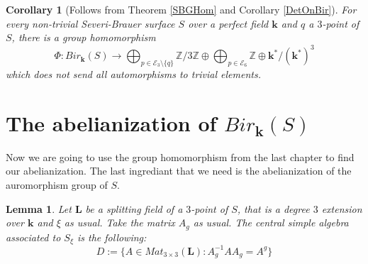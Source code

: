 \documentclass[12pt, oneside, reqno]{amsart}
\newtheorem{lemma}[theorem]{Lemma}
\newtheorem{corollary}[theorem]{Corollary}
\begin{document}
\begin{corollary}[Follows from Theorem \ref{SBGHom} and Corollary \ref{DetOnBir}] \label{AbMap}
    For every non-trivial Severi-Brauer surface $S$ over a perfect field $\textbf{k}$ and $q$ a $3$-point of $S$, there is a group homomorphism \[\Phi:Bir_{\textbf{k}}(S) \rightarrow \bigoplus_{p \in \mathcal{E}_3 \setminus \{ q \}} \mathbb{Z}/3\mathbb{Z} \oplus \bigoplus_{p \in \mathcal{E}_6} \mathbb{Z} \oplus \textbf{k}^* / (\textbf{k}^*)^3\] which does not send all automorphisms to trivial elements.
\end{corollary}

\section{The abelianization of $Bir_{\textbf{k}}(S)$}
\noindent Now we are going to use the group homomorphism from the last chapter to find our abelianization. The last ingrediant that we need is the abelianization of the auromorphism group of $S$.
\begin{lemma}
    Let $\textbf{L}$ be a splitting field of a $3$-point of $S$, that is a degree $3$ extension over $\textbf{k}$ and $\xi$ as usual. Take the matrix $A_g$ as usual. The central simple algebra associated to $S_{\xi}$ is the following:
    \[D:= \{ A \in Mat_{3\times 3}(\textbf{L}) : A_g^{-1}AA_g = A^g\}\]
\end{lemma}
\end{document}
